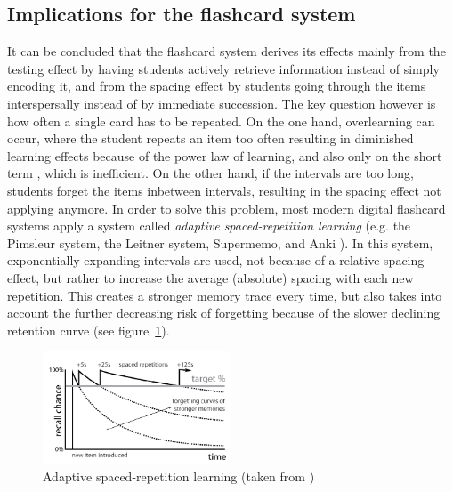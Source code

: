 \subsection{Implications for the flashcard system}

\label{subsec:implicationsflashcards}

It can be concluded that the flashcard system derives its effects mainly from the testing effect by having students actively retrieve information instead of simply encoding it, and from the spacing effect by students going through the items interspersally instead of by immediate succession. The key question however is how often a single card has to be repeated. On the one hand, overlearning can occur, where the student repeats an item too often resulting in diminished learning effects because of the power law of learning, and also only on the short term \cite{rohrer}, which is inefficient. On the other hand, if the intervals are too long, students forget the items inbetween intervals, resulting in the spacing effect not applying anymore. In order to solve this problem, most modern digital flashcard systems apply a system called \emph{adaptive spaced-repetition learning} (e.g. the Pimsleur system, the Leitner system, Supermemo, and Anki \cite{microlearning}). In this system, exponentially expanding intervals are used, not because of a relative spacing effect, but rather to increase the average (absolute) spacing with each new repetition. This creates a stronger memory trace every time, but also takes into account the further decreasing risk of forgetting because of the slower declining retention curve (see figure~\ref{fig:spacedrepetition}).

\begin{figure}
    \centering
    \includegraphics[width=0.5\textwidth]{img/spacedrepetition}
    \caption{Adaptive spaced-repetition learning (taken from \protect{})}
    \label{fig:spacedrepetition}
\end{figure}
